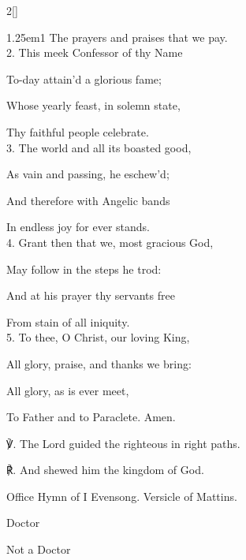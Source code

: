 \begin{paracol}{2}[]
\begin{hangparas}{1.25em}{1}
The prayers and praises that we pay.\\

2. This meek Confessor of thy Name

To-day attain'd a glorious fame;

Whose yearly feast, in solemn state,

Thy faithful people celebrate.\\

3. The world and all its boasted good,

As vain and passing, he eschew'd;

And therefore with Angelic bands

In endless joy for ever stands.\\

4. Grant then that we, most gracious God,

May follow in the steps he trod:

And at his prayer thy servants free

From stain of all iniquity.\\

5. To thee, O Christ, our loving King,

All glory, praise, and thanks we bring:

All glory, as is ever meet,

To Father and to Paraclete. Amen.\\
\end{hangparas}

℣. The Lord guided the righteous in right paths.

℟. And shewed him the kingdom of God.


\secondEvensong


\begin{rubric}
	Office Hymn of I Evensong. Versicle of Mattins.
\end{rubric}

\begin{inhead}
	Doctor
\end{inhead}
\begin{inhead}
	Not a Doctor
\end{inhead}

\fussy
\end{paracol}

